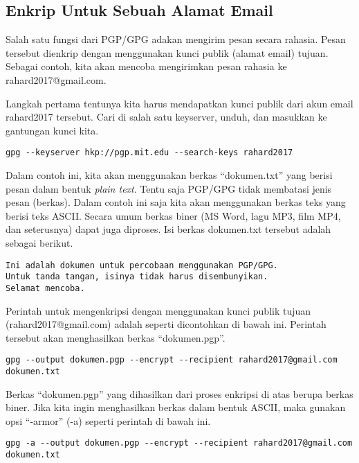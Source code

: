 \subsection{Enkrip Untuk Sebuah Alamat Email}
Salah satu fungsi dari PGP/GPG adakan mengirim pesan secara rahasia. Pesan
tersebut dienkrip dengan menggunakan kunci publik (alamat email) tujuan.
Sebagai contoh, kita akan mencoba mengirimkan pesan rahasia ke
rahard2017@gmail.com.

Langkah pertama tentunya kita harus mendapatkan kunci publik dari akun email
rahard2017 tersebut. Cari di salah satu keyserver, unduh, dan masukkan ke
gantungan kunci kita.

\begin{verbatim}
gpg --keyserver hkp://pgp.mit.edu --search-keys rahard2017
\end{verbatim}

Dalam contoh ini, kita akan menggunakan berkas ``dokumen.txt'' yang berisi
pesan dalam bentuk {\em plain text}. Tentu saja PGP/GPG tidak membatasi jenis
pesan (berkas). Dalam contoh ini saja kita akan menggunakan berkas teks yang
berisi teks ASCII. Secara umum berkas biner (MS Word, lagu MP3, film MP4, dan
seterusnya) dapat juga diproses. Isi berkas dokumen.txt tersebut adalah sebagai
berikut.

\begin{mdframed}[backgroundcolor=blue!20] 
\begin{verbatim}
Ini adalah dokumen untuk percobaan menggunakan PGP/GPG.
Untuk tanda tangan, isinya tidak harus disembunyikan.
Selamat mencoba.
\end{verbatim}
\end{mdframed}

Perintah untuk mengenkripsi dengan menggunakan kunci publik tujuan
(rahard2017@gmail.com) adalah seperti dicontohkan di bawah ini. Perintah
tersebut akan menghasilkan berkas ``dokumen.pgp''.

\begin{verbatim}
gpg --output dokumen.pgp --encrypt --recipient rahard2017@gmail.com dokumen.txt
\end{verbatim}

Berkas ``dokumen.pgp'' yang dihasilkan dari proses enkripsi di atas berupa
berkas biner. Jika kita ingin menghasilkan berkas dalam bentuk ASCII, maka
gunakan opsi ``-armor'' (-a) seperti perintah di bawah ini.

\begin{verbatim}
gpg -a --output dokumen.pgp --encrypt --recipient rahard2017@gmail.com dokumen.txt
\end{verbatim}

